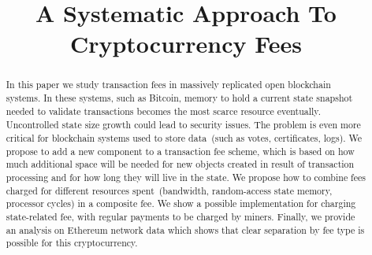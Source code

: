 \documentclass[]{llncs}   %
\newcommand{\authnote}[2]{\marginpar{\parbox{\marginparwidth}{\tiny %
  \textsf{#1 {\textcolor{blue}{notes: #2}}}}}%
  \textcolor{blue}{\textbf{\dag}}}
\newcommand{\authnote}[2]{
  \textsf{#1\textcolor{blue}{ #2}}}
\newcommand{\authnote}[2]{}
\newcommand{\knote}[1]{{\authnote{\textcolor{green}{Alex notes:}}{#1}}}
\newcommand{\dnote}[1]{{\authnote{\textcolor{red}{Dima notes:}}{#1}}}
\begin{document}
\title{A Systematic Approach To Cryptocurrency Fees}


\maketitle

\begin{abstract}


In this paper we study transaction fees in massively replicated open
blockchain systems. In these systems, such as Bitcoin, memory to hold a current
state snapshot needed to validate transactions becomes the most scarce resource \dnote{not the most, just one of}
eventually. Uncontrolled state size growth could lead
to security issues. 
The problem is even more critical for blockchain systems used to store
data~(such as votes, certificates, logs). We propose to add a new component to a transaction fee scheme, which is based on
how much additional space will be needed for new objects created in result of
transaction processing and for how long they will live in the state. We propose how to 
combine fees charged for different resources spent~(bandwidth, random-access state memory, processor cycles) 
in a composite fee. We show a possible implementation for charging state-related fee, with regular payments to be charged by miners.
Finally, we provide an analysis on Ethereum network data which shows that clear separation by fee type is possible for this cryptocurrency.


\end{abstract}
\end{document}
